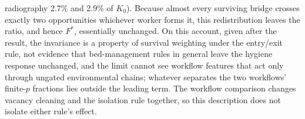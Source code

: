 radiography 2.7\% and 2.9\% of $K_0$). Because almost every surviving bridge
crosses exactly two opportunities whichever worker forms it, this
redistribution leaves the ratio, and hence $F^*$, essentially unchanged. On this
account, given after the result, the invariance is a property of survival
weighting under the entry/exit rule, not evidence that bed-management rules in general leave the hygiene
response unchanged, and the limit cannot see workflow features that act only
through ungated environmental chains; whatever separates the two workflows'
finite-$p$ fractions lies outside the leading term. The workflow comparison
changes vacancy cleaning and the isolation rule together, so this description
does not isolate either rule's effect.

